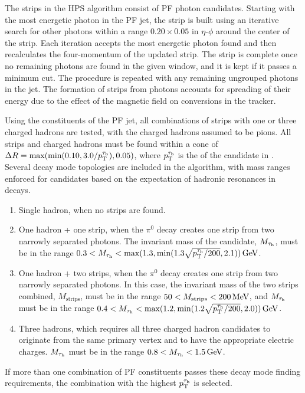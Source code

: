 The strips in the HPS algorithm consist of PF photon candidates. Starting with the most energetic photon in the PF jet, the strip is built using an iterative search for other photons within a range $0.20\times0.05$ in $\eta$-$\phi$ around the center of the strip. Each iteration accepts the most energetic photon found and then recalculates the four-momentum of the updated strip. The strip is complete once no remaining photons are found in the given window, and it is kept if it passes a minimum \pt cut. The procedure is repeated with any remaining ungrouped photons in the jet. The formation of strips from photons accounts for spreading of their energy due to the effect of the magnetic field on conversions in the tracker.

Using the constituents of the PF jet, all combinations of strips with one or three charged hadrons are tested, with the charged hadrons assumed to be pions. All strips and charged hadrons must be found within a cone of $\Delta R = \text{max}(\text{min}(0.10,3.0/p_{\mathrm{T}}^{\tau_{\text{h}}}),0.05)$, where $p_{\mathrm{T}}^{\tau_{\text{h}}}$ is the \pt of the \tauh candidate in \GeVns. Several decay mode topologies are included in the algorithm, with mass ranges enforced for candidates based on the expectation of hadronic resonances in decays.
\begin{enumerate}
\item Single hadron, when no strips are found.
\item One hadron + one strip, when the $\pi^0$ decay creates one strip from two narrowly separated photons. The invariant mass of the \tauh candidate, $M_{\tau_{\text{h}}}$, must be in the range $0.3 < M_{\tau_{\text{h}}} < \text{max}(1.3,\text{min}(1.3\sqrt{p_{\mathrm{T}}^{\tau_{\text{h}}}/200},2.1))\,\text{Ge\hspace{-.08em}V}$.
\item One hadron + two strips, when the $\pi^0$ decay creates one strip from two narrowly separated photons. In this case, the invariant mass of the two strips combined, $M_{\text{strips}}$, must be in the range $50 < M_{\text{strips}} < 200\,\text{Me\hspace{-.08em}V}$, and $M_{\tau_{\text{h}}}$ must be in the range $0.4 < M_{\tau_{\text{h}}} < \text{max}(1.2,\text{min}(1.2\sqrt{p_{\mathrm{T}}^{\tau_{\text{h}}}/200},2.0))\,\text{Ge\hspace{-.08em}V}$.
\item Three hadrons, which requires all three charged hadron candidates to originate from the same primary vertex and to have the appropriate electric charges. $M_{\tau_{\text{h}}}$ must be in the range $0.8 < M_{\tau_{\text{h}}} < 1.5\,\text{Ge\hspace{-.08em}V}$.
\end{enumerate}
If more than one combination of PF constituents passes these decay mode finding requirements, the combination with the highest $p_{\mathrm{T}}^{\tau_{\text{h}}}$ is selected.

